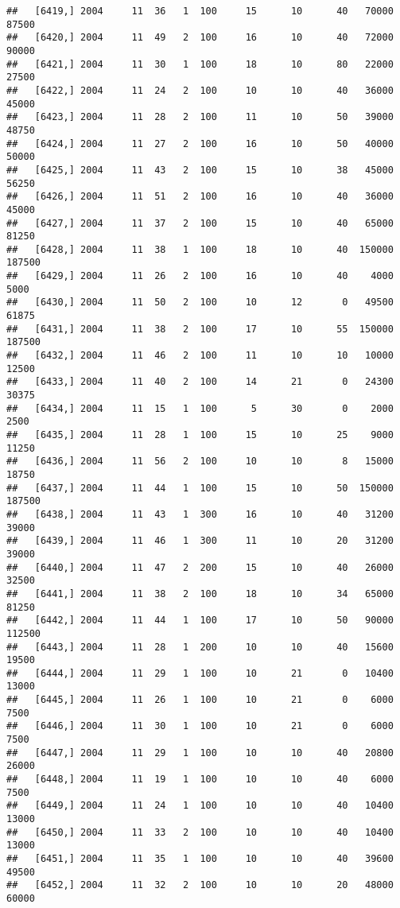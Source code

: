 \documentclass{article}\usepackage[]{graphicx}\usepackage[]{color}
\makeatletter
\newenvironment{kframe}{%
 \def\at@end@of@kframe{}%
 \ifinner\ifhmode%
  \def\at@end@of@kframe{\end{minipage}}%
  \begin{minipage}{\columnwidth}%
 \fi\fi%
 \def\FrameCommand##1{\hskip\@totalleftmargin \hskip-\fboxsep
 \colorbox{shadecolor}{##1}\hskip-\fboxsep
     \hskip-\linewidth \hskip-\@totalleftmargin \hskip\columnwidth}%
 \MakeFramed {\advance\hsize-\width
   \@totalleftmargin\z@ \linewidth\hsize
   \@setminipage}}%
 {\par\unskip\endMakeFramed%
 \at@end@of@kframe}
\newenvironment{knitrout}{}{} %
\makeatother
\begin{document}
\begin{knitrout}
\begin{kframe}
\begin{verbatim}
##   [6419,] 2004     11  36   1  100     15      10      40   70000   87500
##   [6420,] 2004     11  49   2  100     16      10      40   72000   90000
##   [6421,] 2004     11  30   1  100     18      10      80   22000   27500
##   [6422,] 2004     11  24   2  100     10      10      40   36000   45000
##   [6423,] 2004     11  28   2  100     11      10      50   39000   48750
##   [6424,] 2004     11  27   2  100     16      10      50   40000   50000
##   [6425,] 2004     11  43   2  100     15      10      38   45000   56250
##   [6426,] 2004     11  51   2  100     16      10      40   36000   45000
##   [6427,] 2004     11  37   2  100     15      10      40   65000   81250
##   [6428,] 2004     11  38   1  100     18      10      40  150000  187500
##   [6429,] 2004     11  26   2  100     16      10      40    4000    5000
##   [6430,] 2004     11  50   2  100     10      12       0   49500   61875
##   [6431,] 2004     11  38   2  100     17      10      55  150000  187500
##   [6432,] 2004     11  46   2  100     11      10      10   10000   12500
##   [6433,] 2004     11  40   2  100     14      21       0   24300   30375
##   [6434,] 2004     11  15   1  100      5      30       0    2000    2500
##   [6435,] 2004     11  28   1  100     15      10      25    9000   11250
##   [6436,] 2004     11  56   2  100     10      10       8   15000   18750
##   [6437,] 2004     11  44   1  100     15      10      50  150000  187500
##   [6438,] 2004     11  43   1  300     16      10      40   31200   39000
##   [6439,] 2004     11  46   1  300     11      10      20   31200   39000
##   [6440,] 2004     11  47   2  200     15      10      40   26000   32500
##   [6441,] 2004     11  38   2  100     18      10      34   65000   81250
##   [6442,] 2004     11  44   1  100     17      10      50   90000  112500
##   [6443,] 2004     11  28   1  200     10      10      40   15600   19500
##   [6444,] 2004     11  29   1  100     10      21       0   10400   13000
##   [6445,] 2004     11  26   1  100     10      21       0    6000    7500
##   [6446,] 2004     11  30   1  100     10      21       0    6000    7500
##   [6447,] 2004     11  29   1  100     10      10      40   20800   26000
##   [6448,] 2004     11  19   1  100     10      10      40    6000    7500
##   [6449,] 2004     11  24   1  100     10      10      40   10400   13000
##   [6450,] 2004     11  33   2  100     10      10      40   10400   13000
##   [6451,] 2004     11  35   1  100     10      10      40   39600   49500
##   [6452,] 2004     11  32   2  100     10      10      20   48000   60000

\end{verbatim}
\end{kframe}
\end{knitrout}
\end{document}
